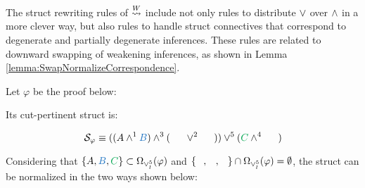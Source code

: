 \documentclass{llncs}
\begin{document}
\begin{remark}
The struct rewriting rules of $\normalizePlusTimesS$ include not only rules to distribute $\structtimes$ over $\structplus$ in a more clever way, but also rules to handle struct connectives that correspond to degenerate and partially degenerate inferences. These rules are related to downward swapping of weakening inferences, as shown in Lemma \ref{lemma:SwapNormalizeCorrespondence}.
\end{remark}




\begin{example}
\label{example:PlusTimesSwapNormalization}
Let $\varphi$ be the proof below:

\begin{prooftree}
		 
	 
						 
					 
					 
									 
								 
\end{prooftree}

Its cut-pertinent struct is:

$$
\cutpertstruct{\varphi} 
\equiv 
((\hA{A} \structplus^1 \hB{B}) \structplus^3 (\hC{\structdual{B}} \structtimes^2 \hD{\structdual{A}}))
\structtimes^5
(\hE{C} \structplus^4 \hF{\structdual{C}})
$$

Considering that $\{ \hA{A}, \hB{B}, \hE{C}\} \subset \occInference{\varphi}{\vee_l^5}$ and $\{ \hD{A}, \hC{B}, \hF{C} \} \cap \occInference{\varphi}{\vee_l^5} = \emptyset$, the struct can be normalized in the two ways shown below:


\end{example}
\end{document}

